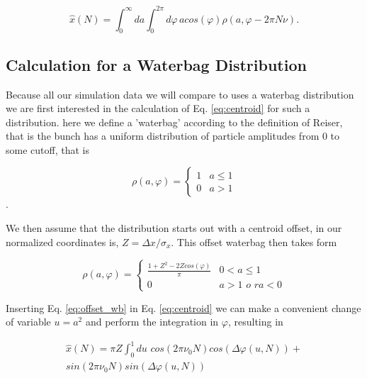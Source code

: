 \documentclass[aps,prstab,twocolumn, groupedaddress]{revtex4-1}
\begin{document}
\begin{equation} \label{eq:centroid}
\hat{x}(N) = \int_{0}^{\infty}da \int_{0}^{2\pi}d\varphi \, a cos(\varphi) \rho(a,
\varphi -
2\pi N \nu).
\end{equation}

\subsection{Calculation for a Waterbag Distribution}

Because all our simulation data we will compare to uses a waterbag distribution we are 
first interested in the calculation of Eq. \ref{eq:centroid} for such a distribution. here we 
define a 'waterbag' according to the definition of Reiser, that is the bunch has a uniform 
distribution of particle amplitudes from 0 to some cutoff, that is

\begin{equation} \label{eq:waterbag}
\rho(a, \varphi) =
\left\{
\begin{array}{lr}
1 &  a \leq 1 \\
0 &  a > 1
\end{array}
\right.
\end{equation}. 

We then assume that the distribution starts out with a centroid offset, in our normalized 
coordinates is, $Z = \Delta x / \sigma_x$. This offset waterbag then takes form

\begin{equation} \label{eq:offset_wb}
\rho(a, \varphi) =
\left\{
\begin{array}{lr}
\frac{1 + Z^2 - 2Zcos(\varphi)}{\pi} &  0 < a \leq 1 \\
0 &  a > 1 \, \,o \, \,r a < 0
\end{array}
\right.
\end{equation}

Inserting Eq. \ref{eq:offset_wb} in Eq. \ref{eq:centroid} we can make a convenient change 
of variable $u=a^2$ and perform the integration in $\varphi$, resulting in

\begin{multline}
\hat{x}(N) = \pi Z \int_{0}^{1} du \,\, cos(2 \pi \nu_0 N)cos(\Delta \varphi(u, N)) +\\  sin(2 
\pi 
\nu_0 N) sin(\Delta \varphi(u, N))
\end{multline}
\end{document}
